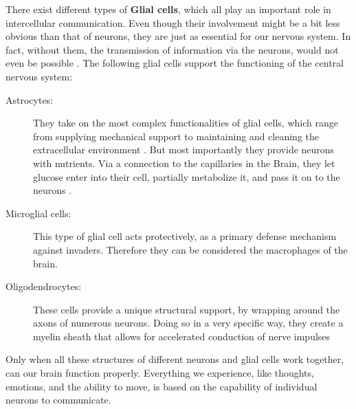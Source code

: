     
    There exist different types of \textbf{Glial cells}, which all play an important role in intercellular communication. Even though their involvement might be a bit less obvious than that of neurons, they are just as essential for our nervous system. In fact, without them, the transmission of information via the neurons, would not even be possible \cite{Banich.2018}. 
        The following glial cells support the functioning of the central nervous system:
        \begin{description}
            \item[Astrocytes:] They take on the most complex functionalities of glial cells, which range from supplying mechanical support to maintaining and cleaning the extracellular environment \cite{thebrain-SimpleToComplex-cellularFunction-i}. But most importantly they provide neurons with nutrients. Via a connection to the capillaries in the Brain, they let glucose enter into their cell, partially metabolize it, and pass it on to the neurons \cite{thebrain-SimpleToComplex-cellularFunction-a}.
            \item[Microglial cells:] This type of glial cell acts protectively, as a primary defense mechanism against invaders. Therefore they can be considered the macrophages of the brain. 
            \item[Oligodendrocytes:] These cells provide a unique structural support, by wrapping around the axons of numerous neurons. Doing so in a very specific way, they create a myelin sheath that allows for accelerated conduction of nerve impulses \cite{thebrain-SimpleToComplex-cellularFunction-i}
        \end{description}

    
    Only when all these structures of different neurons and glial cells work together, can our brain function properly. Everything we experience, like thoughts, emotions, and the ability to move, is based on the capability of individual neurons to communicate.
    
